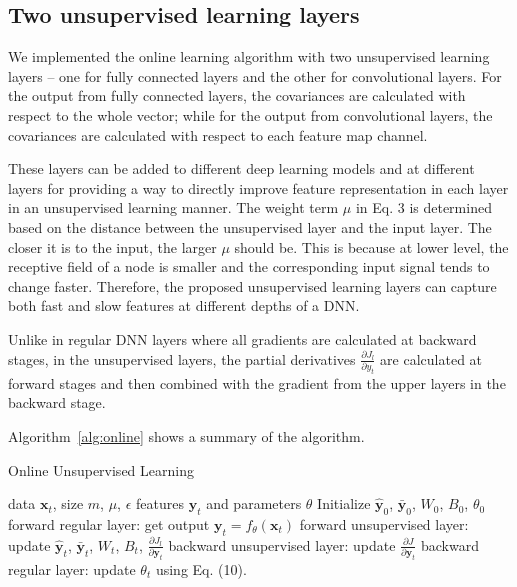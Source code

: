 \documentclass{article}
\begin{document}
\subsection{Two unsupervised learning layers}
We implemented the online learning algorithm with two unsupervised learning layers
 -- one for fully connected layers and the other for convolutional layers.
For the output from fully connected layers, the covariances are calculated with
respect to the whole vector; while for the output from convolutional layers,
the covariances are calculated with respect to each feature map channel.

These layers can be added to different deep learning models and at different
layers for providing a way to directly improve feature representation in each layer in an unsupervised learning manner. The weight term
$\mu$ in Eq. 3 is determined based on the distance between the unsupervised 
layer and the input layer. The closer it is to the input, the larger $\mu$
should be. This is because at lower level, the receptive field of a node is
smaller and the corresponding input signal tends to change faster. Therefore,
the proposed unsupervised learning layers can capture both fast and slow 
features at different depths of a DNN.

Unlike in regular DNN layers where all gradients are calculated at backward stages, 
in the unsupervised layers, the 
partial derivatives $\frac{\partial J_l}{\partial y_t}$ are calculated at 
forward stages and then combined with the gradient from the upper layers in the 
backward stage.
 
Algorithm~\ref{alg:online} shows a summary of the algorithm.

\begin{algorithm}[ht]
   \caption{Online Unsupervised Learning}
   \label{alg:online}
\begin{algorithmic}
    data $\mathbf{x}_t$, size $m$, $\mu$, $\epsilon$
    features $\mathbf{y}_t$ and parameters $\theta$
   \REPEAT
   \STATE Initialize $\hat{\mathbf{y}}_0$, $\bar{\mathbf{y}}_0$, $W_0$, $B_0$, $\theta_0$
   \STATE forward regular layer: get output $\mathbf{y}_t = f_\theta(\mathbf{x}_t)$
   \STATE forward unsupervised layer: update $\hat{\mathbf{y}}_t$, $\bar{\mathbf{y}}_t$, $W_t$, $B_t$, $\frac{\partial J_l}{\partial \mathbf{y}_t}$ 
   \STATE backward unsupervised layer: update $\frac{\partial J}{\partial \mathbf{y}_t}$
   \STATE backward regular layer: update $\theta_t$ using Eq. (10).
   \ENDFOR
\end{algorithmic}
\end{algorithm}
\end{document}
